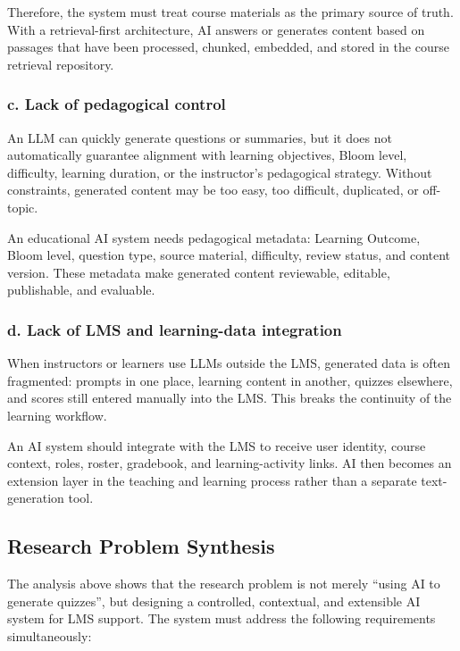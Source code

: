 Therefore, the system must treat course materials as the primary source of
truth. With a retrieval-first architecture, AI answers or generates content
based on passages that have been processed, chunked, embedded, and stored in
the course retrieval repository.

\subsubsection*{c. Lack of pedagogical control}

An LLM can quickly generate questions or summaries, but it does not
automatically guarantee alignment with learning objectives, Bloom level,
difficulty, learning duration, or the instructor's pedagogical strategy.
Without constraints, generated content may be too easy, too difficult,
duplicated, or off-topic.

An educational AI system needs pedagogical metadata: Learning Outcome, Bloom
level, question type, source material, difficulty, review status, and content
version. These metadata make generated content reviewable, editable,
publishable, and evaluable.

\subsubsection*{d. Lack of LMS and learning-data integration}

When instructors or learners use LLMs outside the LMS, generated data is often
fragmented: prompts in one place, learning content in another, quizzes
elsewhere, and scores still entered manually into the LMS. This breaks the
continuity of the learning workflow.

An AI system should integrate with the LMS to receive user identity, course
context, roles, roster, gradebook, and learning-activity links. AI then becomes
an extension layer in the teaching and learning process rather than a separate
text-generation tool.

\subsection{Research Problem Synthesis}

The analysis above shows that the research problem is not merely ``using AI to
generate quizzes'', but designing a controlled, contextual, and extensible AI
system for LMS support. The system must address the following requirements
simultaneously:

